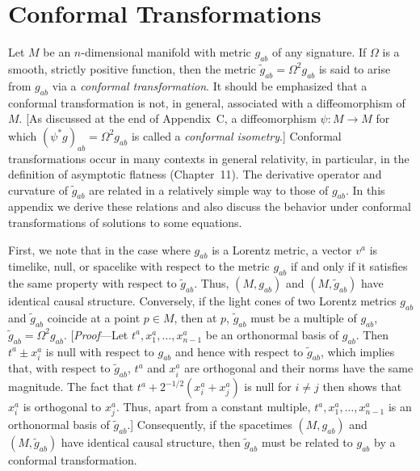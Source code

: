 
\section{Conformal Transformations}

Let \(M\) be an \(n\)-dimensional manifold with metric \(g_{ab}\) of any signature.
If \(\Omega\) is a smooth, strictly positive function, then the metric
\(\widetilde g_{ab}=\Omega^2g_{ab}\) is said to arise from \(g_{ab}\) via a
\emph{conformal transformation}. It should be emphasized that a conformal
transformation is not, in general, associated with a diffeomorphism of \(M\). [As
discussed at the end of Appendix~C, a diffeomorphism \(\psi:M\to M\) for which
\((\psi^*g)_{ab}=\Omega^2g_{ab}\) is called a \emph{conformal isometry}.] Conformal
transformations occur in many contexts in general relativity, in particular, in the
definition of asymptotic flatness (Chapter~11). The derivative operator and curvature
of \(\widetilde g_{ab}\) are related in a relatively simple way to those of \(g_{ab}\).
In this appendix we derive these relations and also discuss the behavior under
conformal transformations of solutions to some equations.

First, we note that in the case where \(g_{ab}\) is a Lorentz metric, a vector \(v^a\)
is timelike, null, or spacelike with respect to the metric \(g_{ab}\) if and only if
it satisfies the same property with respect to \(\widetilde g_{ab}\). Thus,
\((M,g_{ab})\) and \((M,\widetilde g_{ab})\) have identical causal structure.
Conversely, if the light cones of two Lorentz metrics \(g_{ab}\) and
\(\widetilde g_{ab}\) coincide at a point \(p\in M\), then at \(p\),
\(\widetilde g_{ab}\) must be a multiple of \(g_{ab}\),
\(\widetilde g_{ab}=\Omega^2g_{ab}\). [\emph{Proof}---Let
\(t^a,x_1^a,\ldots,x_{n-1}^a\) be an orthonormal basis of \(g_{ab}\). Then
\(t^a\pm x_i^a\) is null with respect to \(g_{ab}\) and hence with respect to
\(\widetilde g_{ab}\), which implies that, with respect to \(\widetilde g_{ab}\),
\(t^a\) and \(x_i^a\) are orthogonal and their norms have the same magnitude. The
fact that \(t^a+2^{-1/2}(x_i^a+x_j^a)\) is null for \(i\ne j\) then shows that
\(x_i^a\) is orthogonal to \(x_j^a\). Thus, apart from a constant multiple,
\(t^a,x_1^a,\ldots,x_{n-1}^a\) is an orthonormal basis of
\(\widetilde g_{ab}\).] Consequently, if the spacetimes \((M,g_{ab})\) and
\((M,\widetilde g_{ab})\) have identical causal structure, then
\(\widetilde g_{ab}\) must be related to \(g_{ab}\) by a conformal transformation.

